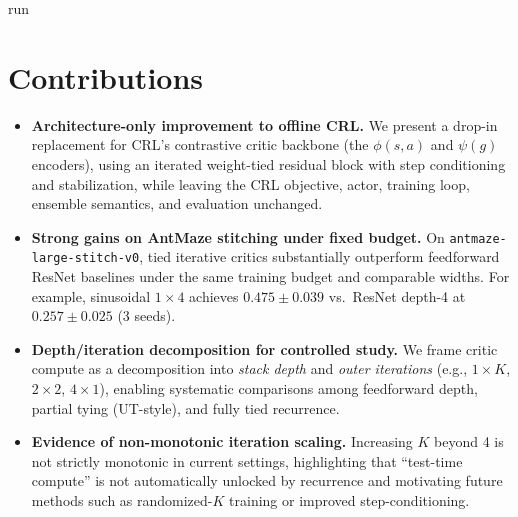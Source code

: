 run\documentclass[11pt]{article}
\begin{document}
\section{Contributions}
\begin{itemize}
  \item \textbf{Architecture-only improvement to offline CRL.} We present a drop-in replacement for CRL's contrastive critic backbone (the $\phi(s,a)$ and $\psi(g)$ encoders), using an iterated weight-tied residual block with step conditioning and stabilization, while leaving the CRL objective, actor, training loop, ensemble semantics, and evaluation unchanged.

  \item \textbf{Strong gains on AntMaze stitching under fixed budget.} On \texttt{antmaze-large-stitch-v0}, tied iterative critics substantially outperform feedforward ResNet baselines under the same training budget and comparable widths. For example, sinusoidal $1\times4$ achieves $0.475 \pm 0.039$ vs.\ ResNet depth-4 at $0.257 \pm 0.025$ (3 seeds).

  \item \textbf{Depth/iteration decomposition for controlled study.} We frame critic compute as a decomposition into \emph{stack depth} and \emph{outer iterations} (e.g., $1\times K$, $2\times2$, $4\times1$), enabling systematic comparisons among feedforward depth, partial tying (UT-style), and fully tied recurrence.

  \item \textbf{Evidence of non-monotonic iteration scaling.} Increasing $K$ beyond 4 is not strictly monotonic in current settings, highlighting that ``test-time compute'' is not automatically unlocked by recurrence and motivating future methods such as randomized-$K$ training or improved step-conditioning.
\end{itemize}
\end{document}
